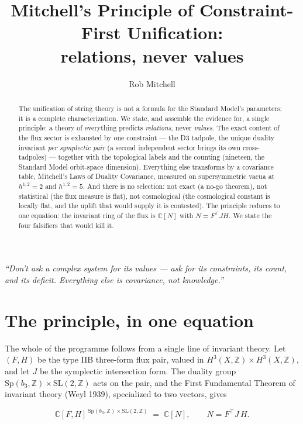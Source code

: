 \documentclass[11pt]{article}
\title{Mitchell's Principle of Constraint-First Unification:\\ relations, never values}
\author{Rob Mitchell}
\date{}
\newcommand{\bthree}{b_3}
\newcommand{\flux}{F}
\newcommand{\hh}{H}
\begin{document}
\maketitle

\begin{center}\itshape
``Don't ask a complex system for its values --- ask for its constraints, its count, and its
deficit. Everything else is covariance, not knowledge.''
\end{center}

\begin{abstract}
The unification of string theory is not a formula for the Standard Model's parameters; it is a
complete characterization. We state, and assemble the evidence for, a single principle: a theory
of everything predicts \emph{relations}, never \emph{values}. The exact content of the flux sector
is exhausted by one constraint --- the D3 tadpole, the unique duality invariant \emph{per symplectic
pair} (a second independent sector brings its own cross-tadpoles) --- together with
the topological labels and the counting (nineteen, the Standard Model orbit-space dimension).
Everything else transforms by a covariance table, Mitchell's Laws of Duality Covariance, measured
on supersymmetric vacua at $h^{1,2}=2$ and $h^{1,2}=5$. And there is no selection: not exact (a
no-go theorem), not statistical (the flux measure is flat), not cosmological (the cosmological
constant is locally flat, and the uplift that would supply it is contested). The principle
reduces to one equation: the invariant ring of the flux is $\mathbb{C}[N]$ with $N=\flux^\top
J\hh$. We state the four falsifiers that would kill it.
\end{abstract}

\section{The principle, in one equation}

The whole of the programme follows from a single line of invariant theory. Let $(\flux,\hh)$ be
the type IIB three-form flux pair, valued in $H^3(X,\mathbb{Z})\times H^3(X,\mathbb{Z})$, and let
$J$ be the symplectic intersection form. The duality group $\mathrm{Sp}(\bthree,\mathbb{Z})\times
\mathrm{SL}(2,\mathbb{Z})$ acts on the pair, and the First Fundamental Theorem of invariant theory
(Weyl 1939), specialized to two vectors, gives

\begin{equation}
\mathbb{C}[\flux,\hh]^{\,\mathrm{Sp}(\bthree,\mathbb{Z})\times \mathrm{SL}(2,\mathbb{Z})}
\;=\; \mathbb{C}[N],
\qquad N = \flux^\top J\,\hh .
\label{eq:ring}
\end{equation}
\end{document}
